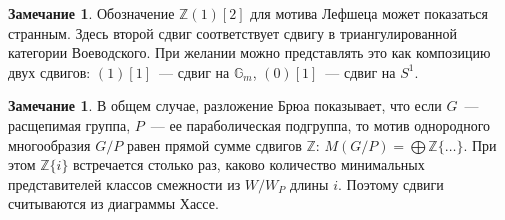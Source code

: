 \documentclass[a4paper]{article}
\theoremstyle{definition}
\newtheorem{remark}[theorem]{Замечание}
\begin{document}
\begin{remark}
Обозначение $\mathbb{Z}(1)[2]$ для мотива Лефшеца может показаться странным.
Здесь второй сдвиг соответствует сдвигу в триангулированной категории
Воеводского.
При желании можно представлять это как композицию двух сдвигов:
$(1)[1]$~--- сдвиг на $\mathbb{G}_m$, $(0)[1]$~--- сдвиг на $S^1$.
\end{remark}

\begin{remark}
В общем случае, разложение Брюа показывает, что если $G$~--- расщепимая
группа, $P$~--- ее параболическая подгруппа,
то мотив однородного многообразия $G/P$ равен прямой сумме
сдвигов $\mathbb{Z}$:
$M(G/P) = \bigoplus\mathbb{Z}\{\dots\}$.
При этом $\mathbb{Z}\{i\}$ встречается столько раз, каково количество
минимальных представителей классов смежности из $W/W_P$ длины $i$.
Поэтому сдвиги считываются из диаграммы Хассе.
\end{remark}
\end{document}
